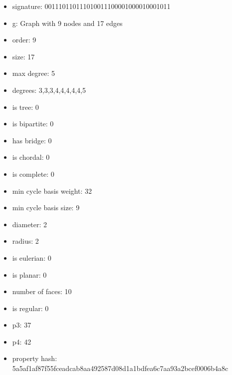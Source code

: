 \newpage
\begin{figure}
\end{figure}
\begin{itemize}
\item signature: 001110110111010011100001000010001011
\item g: Graph with 9 nodes and 17 edges
\item order: 9
\item size: 17
\item max degree: 5
\item degrees: 3,3,3,4,4,4,4,4,5
\item is tree: 0
\item is bipartite: 0
\item has bridge: 0
\item is chordal: 0
\item is complete: 0
\item min cycle basis weight: 32
\item min cycle basis size: 9
\item diameter: 2
\item radius: 2
\item is eulerian: 0
\item is planar: 0
\item number of faces: 10
\item is regular: 0
\item p3: 37
\item p4: 42
\item property hash: 5a5af1af87f55fceadcab8aa492587d08d1a1bdfea6c7aa93a2bcef0006b4a8c
\end{itemize}
